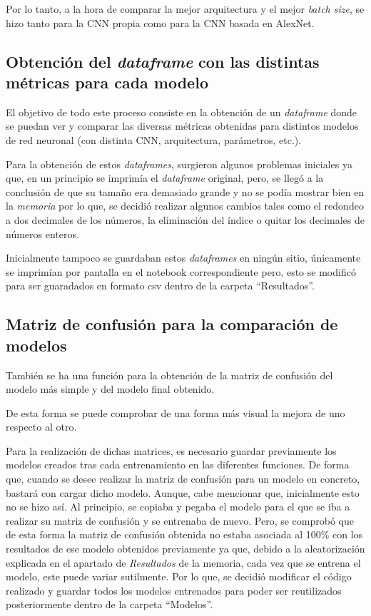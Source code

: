 Por lo tanto, a la hora de comparar la mejor arquitectura y el mejor \textit{batch size}, se hizo tanto para la CNN propia como para la CNN basada en AlexNet.


\subsection{Obtención del \textit{dataframe} con las distintas métricas para cada modelo}

El objetivo de todo este proceso consiste en la obtención de un \textit{dataframe} donde se puedan ver y comparar las diversas métricas obtenidas para distintos modelos de red neuronal (con distinta CNN, arquitectura, parámetros, etc.).

Para la obtención de estos \textit{dataframes}, surgieron algunos problemas iniciales ya que, en un principio se imprimía el \textit{dataframe} original, pero, se llegó a la conclusión de que su tamaño era demasiado grande y no se podía mostrar bien en la \textit{memoria} por lo que, se decidió realizar algunos cambios tales como el redondeo a dos decimales de los números, la eliminación del índice o quitar los decimales de números enteros.

Inicialmente tampoco se guardaban estos \textit{dataframes} en ningún sitio, únicamente se imprimían por pantalla en el notebook correspondiente pero, esto se modificó para ser guaradados en formato csv dentro de la carpeta ``Resultados''.

\subsection{Matriz de confusión para la comparación de modelos}

También se ha una función para la obtención de la matriz de confusión del modelo más simple y del modelo final obtenido.

De esta forma se puede comprobar de una forma más visual la mejora de uno respecto al otro.

Para la realización de dichas matrices, es necesario guardar previamente los modelos creados tras cada entrenamiento en las diferentes funciones. De forma que, cuando se desee realizar la matriz de confusión para un modelo en concreto, bastará con cargar dicho modelo. Aunque, cabe mencionar que, inicialmente esto no se hizo así. Al principio, se copiaba y pegaba el modelo para el que se iba a realizar su matriz de confusión y se entrenaba de nuevo. Pero, se comprobó que de esta forma la matriz de confusión obtenida no estaba asociada al 100\% con los resultados de ese modelo obtenidos previamente ya que, debido a la aleatorización explicada en el apartado de \textit{Resultados} de la memoria, cada vez que se entrena el modelo, este puede variar sutilmente. Por lo que, se decidió modificar el código realizado y guardar todos los modelos entrenados para poder ser reutilizados posteriormente dentro de la carpeta ``Modelos''.

